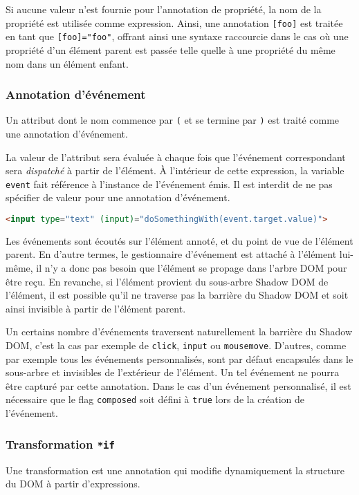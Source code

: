 Si aucune valeur n'est fournie pour l'annotation de propriété, la nom de la propriété est utilisée comme expression. Ainsi, une annotation \texttt{[foo]} est traitée en tant que \texttt{[foo]="foo"}, offrant ainsi une syntaxe raccourcie dans le cas où une propriété d'un élément parent est passée telle quelle à une propriété du même nom dans un élément enfant.

\subsubsection{Annotation d'événement}

Un attribut dont le nom commence par \texttt{(} et se termine par \texttt{)} est traité comme une annotation d'événement.

La valeur de l'attribut sera évaluée à chaque fois que l'événement correspondant sera \emph{dispatché} à partir de l'élément. À l'intérieur de cette expression, la variable \texttt{event} fait référence à l'instance de l'événement émis. Il est interdit de ne pas spécifier de valeur pour une annotation d'événement.

\begin{lstlisting}[language=HTML]
<input type="text" (input)="doSomethingWith(event.target.value)">
\end{lstlisting}

Les événements sont écoutés sur l'élément annoté, et du point de vue de l'élément parent. En d'autre termes, le gestionnaire d'événement est attaché à l'élément lui-même, il n'y a donc pas besoin que l'élément se propage dans l'arbre DOM pour être reçu. En revanche, si l'élément provient du sous-arbre Shadow DOM de l'élément, il est possible qu'il ne traverse pas la barrière du Shadow DOM et soit ainsi invisible à partir de l'élément parent.

Un certains nombre d'événements traversent naturellement la barrière du Shadow DOM, c'est la cas par exemple de \texttt{click}, \texttt{input} ou \texttt{mousemove}. D'autres, comme par exemple tous les événements personnalisés, sont par défaut encapsulés dans le sous-arbre et invisibles de l'extérieur de l'élément. Un tel événement ne pourra être capturé par cette annotation. Dans le cas d'un événement personnalisé, il est nécessaire que le flag \texttt{composed} soit défini à \texttt{true} lors de la création de l'événement.

\subsubsection{Transformation \texttt{*if}}
Une transformation est une annotation qui modifie dynamiquement la structure du DOM à partir d'expressions.

